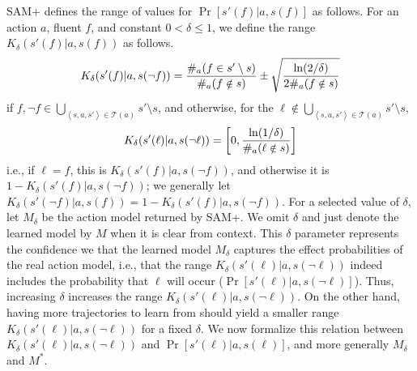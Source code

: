 \documentclass[letterpaper]{article} %
\newcommand{\tuple}[1]{\ensuremath{\left \langle #1 \right \rangle }}
\begin{document}
SAM+ defines the range of values for $\Pr[s'(f)|a,s(f)]$ as follows.
For an action $a$, fluent $f$, and constant $0<\delta\leq 1$, we define the range $K_\delta(s'(f)|a,s(f))$ as follows. 
\begin{equation}\label{eq:present-effects}
\small
K_\delta(s'(f)|a,s(\neg f)) = \frac{\#_a(f\in s'\setminus s)}{\#_a(f\notin s)} \pm\sqrt{\frac{\ln(2/\delta)}{2\#_a(f\notin s)}} 
\end{equation}
if $f,\neg f\in \bigcup_{\tuple{s, a, s'}\in \mathcal{T}(a)} s'\setminus s$, 
and otherwise, for the $\ell\notin\bigcup_{\tuple{s, a, s'}\in \mathcal{T}(a)} s'\setminus s $,
\begin{equation}\label{eq:missing-effects}
\small
K_\delta(s'(\ell)|a,s(\neg\ell)) = \left[0,\frac{\ln(1/\delta)}{\#_a(\ell\notin s)}\right] 
\end{equation}
i.e., if $\ell=f$, this is $K_\delta(s'(f)|a,s(\neg f))$, and otherwise it is $1-K_\delta(s'(f)|a,s(\neg f))$; we generally let $K_\delta(s'(\neg f)|a,s(f))=1-K_\delta(s'(f)|a,s(\neg f))$.
For a selected value of $\delta$, let $M_\delta$ be the action model returned by SAM+. We omit $\delta$ and just denote the learned model by $M$ when it is clear from context. 
This $\delta$ parameter represents the confidence we that the learned model $M_\delta$ captures the effect probabilities of the real action model,  i.e., that the range $K_\delta(s'(\ell)|a,s(\neg\ell))$ indeed includes the probability that $\ell$ will occur ($\Pr[s'(\ell)|a,s(\neg\ell)]$). 
Thus, increasing $\delta$ increases the range $K_\delta(s'(\ell)|a,s(\neg\ell))$. 
On the other hand, having more trajectories to learn from should yield a smaller range $K_\delta(s'(\ell)|a,s(\neg\ell))$ for a fixed $\delta$. %
We now formalize this relation between $K_\delta(s'(\ell)|a,s(\neg\ell))$ and $\Pr[s'(\ell)|a,s(\ell)]$, and more generally $M_\delta$ and $M^*$. 


\end{document}

